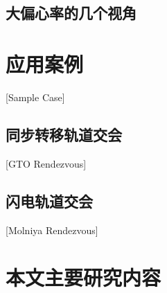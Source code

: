 \subsection{大偏心率的几个视角}
\section{应用案例}[Sample Case]
\subsection{同步转移轨道交会}[GTO Rendezvous]
\subsection{闪电轨道交会}[Molniya Rendezvous]

\section{本文主要研究内容}

